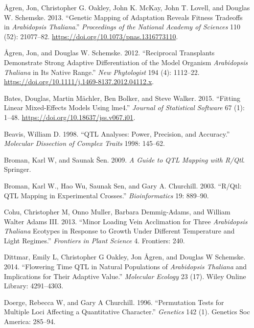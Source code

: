 \documentclass[]{article}
\begin{document}
\leavevmode\hypertarget{ref-agren_genetic_2013}{}%
Ågren, Jon, Christopher G. Oakley, John K. McKay, John T. Lovell, and Douglas W. Schemske. 2013. ``Genetic Mapping of Adaptation Reveals Fitness Tradeoffs in \emph{Arabidopsis Thaliana}.'' \emph{Proceedings of the National Academy of Sciences} 110 (52): 21077--82. \url{https://doi.org/10.1073/pnas.1316773110}.

\leavevmode\hypertarget{ref-agren_reciprocal_2012}{}%
Ågren, Jon, and Douglas W. Schemske. 2012. ``Reciprocal Transplants Demonstrate Strong Adaptive Differentiation of the Model Organism \emph{Arabidopsis Thaliana} in Its Native Range.'' \emph{New Phytologist} 194 (4): 1112--22. \url{https://doi.org/10.1111/j.1469-8137.2012.04112.x}.

\leavevmode\hypertarget{ref-bates2015}{}%
Bates, Douglas, Martin Mächler, Ben Bolker, and Steve Walker. 2015. ``Fitting Linear Mixed-Effects Models Using lme4.'' \emph{Journal of Statistical Software} 67 (1): 1--48. \url{https://doi.org/10.18637/jss.v067.i01}.

\leavevmode\hypertarget{ref-beavis1998qtl}{}%
Beavis, William D. 1998. ``QTL Analyses: Power, Precision, and Accuracy.'' \emph{Molecular Dissection of Complex Traits} 1998: 145--62.

\leavevmode\hypertarget{ref-Broman2009}{}%
Broman, Karl W, and Saunak Šen. 2009. \emph{A Guide to QTL Mapping with R/Qtl}. Springer.

\leavevmode\hypertarget{ref-Broman2003}{}%
Broman, Karl W., Hao Wu, Saunak Sen, and Gary A. Churchill. 2003. ``R/Qtl: QTL Mapping in Experimental Crosses.'' \emph{Bioinformatics} 19: 889--90.

\leavevmode\hypertarget{ref-cohu2013minor}{}%
Cohu, Christopher M, Onno Muller, Barbara Demmig-Adams, and William Walter Adams III. 2013. ``Minor Loading Vein Acclimation for Three \emph{Arabidopsis Thaliana} Ecotypes in Response to Growth Under Different Temperature and Light Regimes.'' \emph{Frontiers in Plant Science} 4. Frontiers: 240.

\leavevmode\hypertarget{ref-dittmar2014flowering}{}%
Dittmar, Emily L, Christopher G Oakley, Jon Ågren, and Douglas W Schemske. 2014. ``Flowering Time QTL in Natural Populations of \emph{Arabidopsis Thaliana} and Implications for Their Adaptive Value.'' \emph{Molecular Ecology} 23 (17). Wiley Online Library: 4291--4303.

\leavevmode\hypertarget{ref-doerge1996permutation}{}%
Doerge, Rebecca W, and Gary A Churchill. 1996. ``Permutation Tests for Multiple Loci Affecting a Quantitative Character.'' \emph{Genetics} 142 (1). Genetics Soc America: 285--94.
\end{document}
